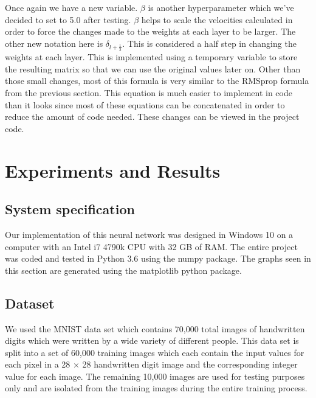\documentclass[12pt]{article}
\theoremstyle{definition}
\theoremstyle{plain}
\begin{document}
Once again we have a new variable. $\beta$ is another hyperparameter which we've decided to set to 5.0 after testing. $\beta$ helps to scale the velocities calculated in order to force the changes made to the weights at each layer to be larger. The other new notation here is $\delta_{l+\frac{1}{2}}$. This is considered a half step in changing the weights at each layer. This is implemented using a temporary variable to store the resulting matrix so that we can use the original values later on. Other than those small changes, most of this formula is very similar to the RMSprop formula from the previous section. This equation is much easier to implement in code than it looks since most of these equations can be concatenated in order to reduce the amount of code needed. These changes can be viewed in the project code.

\section{Experiments and Results}
\subsection{System specification}
Our implementation of this neural network was designed in Windows 10 on a computer with an Intel i7 4790k CPU with 32 GB of RAM. The entire project was coded and tested in Python 3.6 using the numpy package. The graphs seen in this section are generated using the matplotlib python package.

\subsection{Dataset}
We used the MNIST data set which contains 70,000 total images of handwritten digits which were written by a wide variety of different people. This data set is split into a set of 60,000 training images which each contain the input values for each pixel in a 28 $\times$ 28 handwritten digit image and the corresponding integer value for each image. The remaining 10,000 images are used for testing purposes only and are isolated from the training images during the entire training process.
\end{document}
